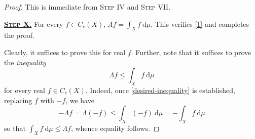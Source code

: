 \documentclass[11pt]{article}
\theoremstyle{thmstyle}
\theoremstyle{defstyle}
\renewcommand{\le}{\leqslant}
\begin{document}
\begin{proof}
    This is immediate from \textsc{Step IV} and \textsc{Step VII}.

    \vspace{0.5cm}

    \noindent\underline{\textbf{\textsc{Step X.}}} For every $f\in C_c(X)$, $\displaystyle\Lambda f = \int_X f~\mathrm d\mu$. This verifies \ref{1} and completes the proof.

    Clearly, it suffices to prove this for real $f$. Further, note that it suffices to prove the \emph{inequality} 
    \begin{equation}\label{desired-inequality}\tag{$\dagger$}
        \Lambda f\le\int_X f~\mathrm d\mu
    \end{equation}
    for every real $f\in C_c(X)$. Indeed, once \eqref{desired-inequality} is established, replacing $f$ with $-f$, we have 
    \begin{equation*}
        -\Lambda f = \Lambda(-f)\le\int_X (-f)~\mathrm d\mu = -\int_X f~\mathrm d\mu
    \end{equation*}
    so that $\displaystyle\int_X f~\mathrm d\mu\le\Lambda f$, whence equality follows.


\end{proof}
\end{document}
